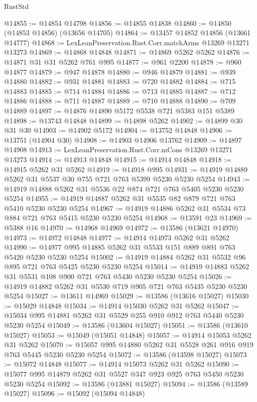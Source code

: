 \begin{lexlean}{RustStd}
\begin{coremodule}
@14855 := @14854 @14798
@14856 := @14855 @14838
@14860 := @14850 (@14853 @14856) (@13656 @14705)
@14864 := @13457 @14852 @14856 (@13661 @14777)
@14868 := LexLeanPreservation.Rust.Corr.matchArms @13269 @13271 @13273
@14869 := @14868 @14848
@14871 := @14869 @5262 @5262
@14876 := @14871 @31 @31 @5262 @761 @995
@14877 := @961 @2200
@14878 := @960 @14877
@14879 := @947 @14878
@14880 := @946 @14879
@14881 := @939 @14880
@14882 := @931 @14881
@14883 := @720 @14882
@14884 := @715 @14883
@14885 := @714 @14884
@14886 := @713 @14885
@14887 := @712 @14886
@14888 := @711 @14887
@14889 := @710 @14888
@14890 := @709 @14889
@14897 := @14876 @14890 @5172 @5538 @721 @5383 @151 @5389
@14898 := @13743 @14848
@14899 := @14898 @5262
@14902 := @14899 @30 @31 @30
@14903 := @14902 @5172
@14904 := @13752 @14848
@14906 := @13751 (@14904 @30)
@14908 := @14903 @14906 @13762
@14909 := @14897 @14908
@14913 := LexLeanPreservation.Rust.Corr.mCons @13269 @13271 @13273
@14914 := @14913 @14848
@14915 := @14914 @14848
@14918 := @14915 @5262 @31 @5262
@14919 := @14918 @995
@14931 := @14919 @14889 @5262 @31 @5537 @30 @755 @721 @763 @5399 @5230 @5230 @5254
@14943 := @14919 @14888 @5262 @31 @5536 @22 @874 @721 @763 @5405 @5230 @5230 @5254
@14955 := @14919 @14887 @5262 @31 @5535 @82 @879 @721 @763 @5410 @5230 @5230 @5254
@14967 := @14919 @14886 @5262 @31 @5534 @73 @884 @721 @763 @5415 @5230 @5230 @5254
@14968 := @13591 @23
@14969 := @5388 @16
@14970 := @14968 @14969
@14972 := @13586 (@13621 @14970)
@14973 := @14972 @14848
@14977 := @14914 @14973 @5262 @31 @5262
@14990 := @14977 @995 @14885 @5262 @31 @5533 @151 @889 @891 @763 @5420 @5230 @5230 @5254
@15002 := @14919 @14884 @5262 @31 @5532 @96 @895 @721 @763 @5425 @5230 @5230 @5254
@15014 := @14919 @14883 @5262 @31 @5531 @108 @900 @721 @763 @5430 @5230 @5230 @5254
@15026 := @14919 @14882 @5262 @31 @5530 @719 @905 @721 @763 @5435 @5230 @5230 @5254
@15027 := @13611 @14969
@15029 := @13586 (@13616 @15027)
@15030 := @15029 @14848
@15034 := @14914 @15030 @5262 @31 @5262
@15047 := @15034 @995 @14881 @5262 @31 @5529 @255 @910 @912 @763 @5440 @5230 @5230 @5254
@15049 := @13586 (@13604 @15027)
@15051 := @13586 (@13610 @15027)
@15053 := @15049 (@15051 @14848)
@15057 := @14914 @15053 @5262 @31 @5262
@15070 := @15057 @995 @14880 @5262 @31 @5528 @261 @916 @919 @763 @5445 @5230 @5230 @5254
@15072 := @13586 (@13598 @15027)
@15073 := @15072 @14848
@15077 := @14914 @15073 @5262 @31 @5262
@15090 := @15077 @995 @14879 @5262 @31 @5527 @347 @923 @925 @763 @5450 @5230 @5230 @5254
@15092 := @13586 (@13881 @15027)
@15094 := @13586 (@13589 @15027)
@15096 := @15092 (@15094 @14848)

\end{coremodule}
\end{lexlean}
